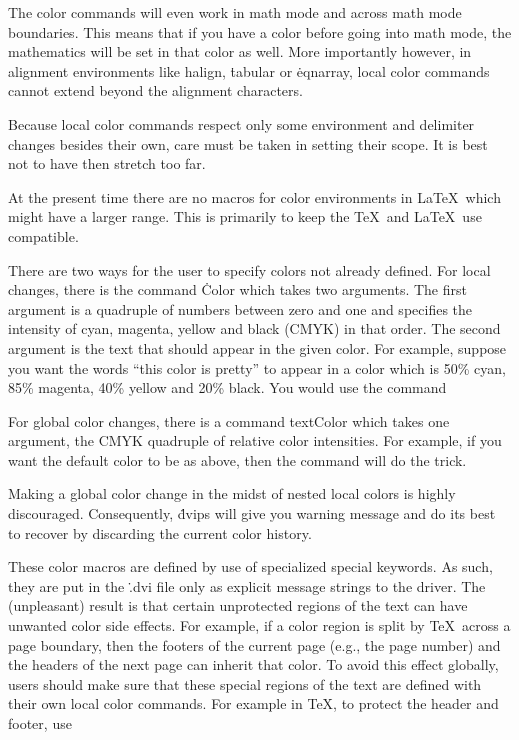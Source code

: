 The color commands will even work in math mode and across math mode
boundaries.  This means that if you have a color before going into
math mode, the mathematics will be set in that color as well.  More
importantly however, in alignment environments like \.{\ttbackslash
halign}, \.{tabular} or \.{eqnarray}, local color commands cannot
extend beyond the alignment characters.

Because local color commands respect only some environment and
delimiter changes besides their own, care must be taken in setting
their scope.  It is best not to have then stretch too far.

At the present time there are no macros for color environments in
La\TeX\ which might have a larger range.  This is primarily to keep
the \TeX\ and La\TeX\ use compatible.


There are two ways for the user to specify colors not already defined.
For local changes, there is the command \.{\ttbackslash Color} which
takes two arguments.  The first argument is a quadruple of numbers
between zero and one and specifies the intensity of cyan, magenta,
yellow and black (CMYK) in that order.	The second argument is the
text that should appear in the given color.  For example, suppose you
want the words ``this color is pretty'' to appear in a color which is
50\% cyan, 85\% magenta, 40\% yellow and 20\% black.  You would use
the command

For global color changes, there is a command \.{\ttbackslash
textColor} which takes one argument, the CMYK quadruple of relative
color intensities.  For example, if you want the default color to be
as above, then the command
\noindent
will do the trick.

Making a global color change in the midst of nested local colors is
highly discouraged.  Consequently, \.{dvips} will give you warning
message and do its best to recover by discarding the current color
history.


These color macros are defined by use of specialized \.{\ttbackslash
special} keywords.  As such, they are put in the \.{.dvi} file only as
explicit message strings to the driver.  The (unpleasant)
result is that certain unprotected regions of the text can have
unwanted color side effects.  For example, if a color region is split
by \TeX\ across a page boundary, then the footers of the current page
(e.g., the page number) and the headers of the next page can inherit
that color.  To avoid this effect globally, users should make sure
that these special regions of the text are defined with their own
local color commands.  For example in \TeX, to protect the header and
footer, use

